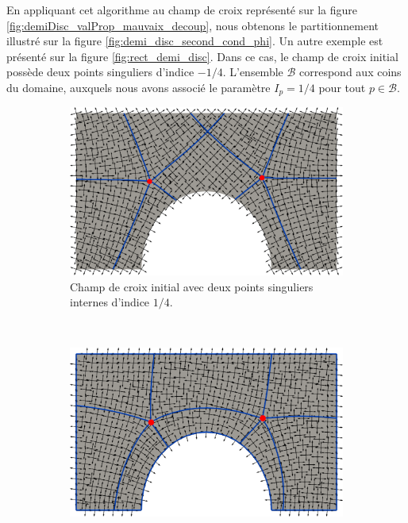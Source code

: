En appliquant cet algorithme au champ de croix représenté sur la figure \ref{fig:demiDisc_valProp_mauvaix_decoup}, nous obtenons le partitionnement illustré sur la figure \ref{fig:demi_disc_second_cond_phi}. Un autre exemple est présenté sur la figure \ref{fig:rect_demi_disc}. Dans ce cas, le champ de croix initial possède deux points singuliers d'indice $-1/4$. L'ensemble $\mathcal{B}$ correspond aux coins du domaine, auxquels nous avons associé le paramètre $I_p=1/4$ pour tout $p\in\mathcal{B}$.



\begin{figure}[!h]
\centering
\begin{subfigure}{0.58\textwidth}
    \includegraphics[width=\textwidth]{images/rect_demi_disc_first.pdf}
    \caption{Champ de croix initial avec deux points singuliers internes d'indice $1/4$.}
    \label{fig:rect_demi_disc_first}
\end{subfigure}
\\[0.46cm]
\begin{subfigure}{0.58\textwidth}
    \includegraphics[width=\textwidth]{images/rect_demi_disc_second.pdf}

\end{subfigure}
\end{figure}
